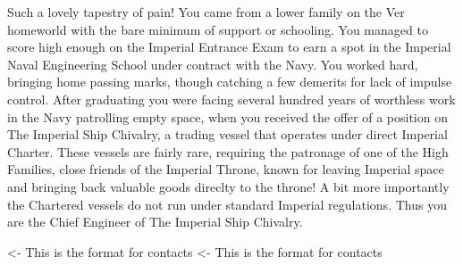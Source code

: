 \documentclass[char]{guildcamp4}
\begin{document}
\name{\cVtwo{}}


Such a lovely tapestry of pain! 
You came from a lower family on the Ver homeworld with the bare minimum of support or schooling. You managed to score high enough
on the Imperial Entrance Exam to earn a spot in the Imperial Naval Engineering School under contract with the Navy. You worked
hard, bringing home passing marks, though catching a few demerits for lack of impulse control. After graduating you were facing 
several hundred years of worthless work in the Navy patrolling empty space, when you received the offer of a position on 
The Imperial Ship Chivalry, a trading vessel that operates under direct Imperial Charter. These vessels are fairly rare, requiring
the patronage of one of the High Families, close friends of the Imperial Throne, known for leaving Imperial space and bringing
back valuable goods direclty to the throne! A bit more importantly the Chartered vessels do not run under standard Imperial regulations.
Thus you are the Chief Engineer of The Imperial Ship Chivalry. 



\begin{itemz}[Goals]
	\item 
\end{itemz}

\begin{itemz}[Notes]
	\item 
\end{itemz}

\begin{contacts}
	\contact{\cVone{}} <- This is the format for contacts 
	\contact{\cVthree{}} <- This is the format for contacts 
	\contact{\cJoan{}}
	\contact{\cJulie{}}
	\contact{\cJames{}}
	\contact{\cRasputin{}}
	\contact{\cSpite{}}
	\contact{\cPlead{}}
\end{contacts}
\end{document}
